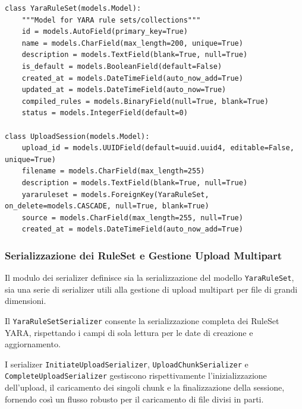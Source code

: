 \begin{verbatim}
class YaraRuleSet(models.Model):
    """Model for YARA rule sets/collections"""
    id = models.AutoField(primary_key=True)
    name = models.CharField(max_length=200, unique=True)
    description = models.TextField(blank=True, null=True)
    is_default = models.BooleanField(default=False)
    created_at = models.DateTimeField(auto_now_add=True)
    updated_at = models.DateTimeField(auto_now=True)
    compiled_rules = models.BinaryField(null=True, blank=True)
    status = models.IntegerField(default=0)
        
class UploadSession(models.Model):
    upload_id = models.UUIDField(default=uuid.uuid4, editable=False, unique=True)
    filename = models.CharField(max_length=255)
    description = models.TextField(blank=True, null=True)
    yararuleset = models.ForeignKey(YaraRuleSet, on_delete=models.CASCADE, null=True, blank=True)
    source = models.CharField(max_length=255, null=True)
    created_at = models.DateTimeField(auto_now_add=True)
\end{verbatim}

\subsubsection{Serializzazione dei RuleSet e Gestione Upload Multipart}
Il modulo dei serializer definisce sia la serializzazione del modello \texttt{YaraRuleSet}, sia una serie di serializer utili alla gestione di upload multipart per file di grandi dimensioni.

Il \texttt{YaraRuleSetSerializer} consente la serializzazione completa dei RuleSet YARA, rispettando i campi di sola lettura per le date di creazione e aggiornamento.

I serializer \texttt{InitiateUploadSerializer}, \texttt{UploadChunkSerializer} e \texttt{CompleteUploadSerializer} gestiscono rispettivamente l'inizializzazione dell'upload, il caricamento dei singoli chunk e la finalizzazione della sessione, fornendo così un flusso robusto per il caricamento di file divisi in parti.


